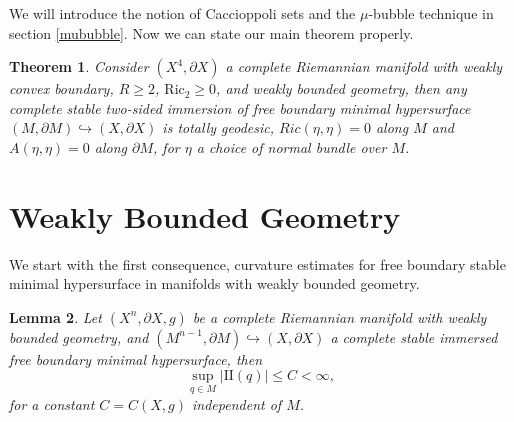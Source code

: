 \documentclass[12pt]{amsart}
\newcommand{\sff}{\mathrm{I\!I}}
\newcommand{\Ric}{\text{Ric}}
\newcommand{\p}{\partial}
\newtheorem{theorem}{Theorem}[section]
\newtheorem{lemma}[theorem]{Lemma}
\numberwithin{equation}{section}
\begin{document}
	We will introduce the notion of Caccioppoli sets and the $\mu$-bubble technique in section \ref{mububble}.
    Now we can state our main theorem properly. 
	\begin{theorem}
		Consider $(X^4, \partial X)$ a complete Riemannian manifold with weakly convex boundary, $R \geq 2$, $\Ric_2 \geq 0$,  and weakly bounded geometry, then any complete stable two-sided immersion of free boundary minimal hypersurface $(M,\partial M)\hookrightarrow (X,\partial X)$ is totally geodesic, $Ric(\eta,\eta)=0$ along $M$ and $A(\eta,\eta)=0$ along $\p M$, for $\eta$ a choice of normal bundle over $M$.
	\end{theorem}



    \section{Weakly Bounded Geometry}
    We start with the first consequence, curvature estimates for free boundary stable minimal hypersurface in manifolds with weakly bounded geometry.
    \begin{lemma} \label{blowup}
		Let $(X^n,\partial X,g)$ be a complete Riemannian manifold with weakly bounded geometry, and $(M^{n-1},\p M) \hookrightarrow (X,\p X)$ a complete stable immersed free boundary minimal hypersurface, then
		\begin{equation*}
			\sup_{q\in M} |\sff(q)| \leq C <\infty,
		\end{equation*}
		for a constant $C=C(X,g)$ independent of $M$.
	\end{lemma}
\end{document}

